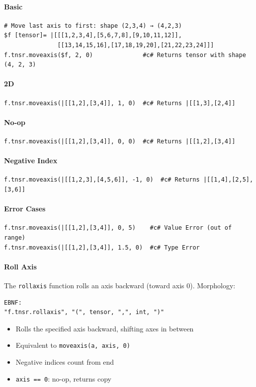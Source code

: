\paragraph{Basic}
\begin{verbatim}
# Move last axis to first: shape (2,3,4) → (4,2,3)
$f [tensor]= |[[[1,2,3,4],[5,6,7,8],[9,10,11,12]],
               [[13,14,15,16],[17,18,19,20],[21,22,23,24]]]
f.tnsr.moveaxis($f, 2, 0)              #c# Returns tensor with shape (4, 2, 3)
\end{verbatim}

\paragraph{2D}
\begin{verbatim}
f.tnsr.moveaxis(|[[1,2],[3,4]], 1, 0)  #c# Returns |[[1,3],[2,4]]
\end{verbatim}

\paragraph{No-op}
\begin{verbatim}
f.tnsr.moveaxis(|[[1,2],[3,4]], 0, 0)  #c# Returns |[[1,2],[3,4]]
\end{verbatim}

\paragraph{Negative Index}
\begin{verbatim}
f.tnsr.moveaxis(|[[1,2,3],[4,5,6]], -1, 0)  #c# Returns |[[1,4],[2,5],[3,6]]
\end{verbatim}

\paragraph{Error Cases}
\begin{verbatim}
f.tnsr.moveaxis(|[[1,2],[3,4]], 0, 5)    #c# Value Error (out of range)
f.tnsr.moveaxis(|[[1,2],[3,4]], 1.5, 0)  #c# Type Error
\end{verbatim}

\paragraph{Roll Axis}
The \texttt{rollaxis} function rolls an axis backward (toward axis 0).
Morphology:
\begin{verbatim}
EBNF:
"f.tnsr.rollaxis", "(", tensor, ",", int, ")"
\end{verbatim}
\begin{itemize}
\item Rolls the specified axis backward, shifting axes in between
\item Equivalent to \texttt{moveaxis(a, axis, 0)}
\item Negative indices count from end
\item \texttt{axis == 0}: no-op, returns copy
\end{itemize}

